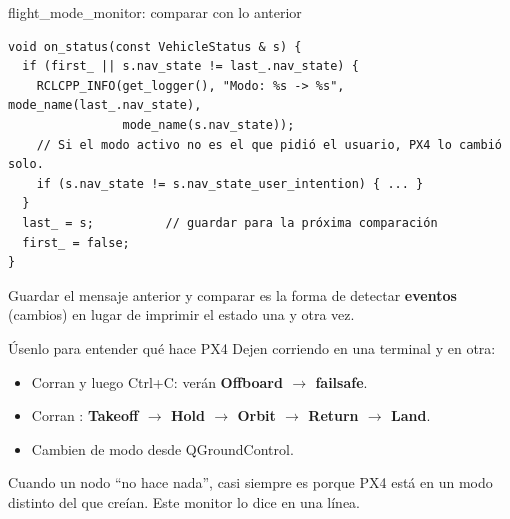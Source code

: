 \begin{frame}[fragile]{flight\_mode\_monitor: comparar con lo anterior}
  \begin{lstlisting}[style=cpp,caption={flight\_mode\_monitor.cpp (recortado)}]
void on_status(const VehicleStatus & s) {
  if (first_ || s.nav_state != last_.nav_state) {
    RCLCPP_INFO(get_logger(), "Modo: %s -> %s", mode_name(last_.nav_state),
                mode_name(s.nav_state));
    // Si el modo activo no es el que pidió el usuario, PX4 lo cambió solo.
    if (s.nav_state != s.nav_state_user_intention) { ... }
  }
  last_ = s;          // guardar para la próxima comparación
  first_ = false;
}
  \end{lstlisting}
  \small Guardar el mensaje anterior y comparar es la forma de detectar \textbf{eventos} (cambios) en
  lugar de imprimir el estado una y otra vez.
\end{frame}

\begin{frame}{Úsenlo para entender qué hace PX4}
  \small Dejen  corriendo en una terminal y en otra:
  \begin{itemize}
    \item Corran  y luego Ctrl+C: verán \textbf{Offboard $\rightarrow$ failsafe}.
    \item Corran : \textbf{Takeoff $\rightarrow$ Hold $\rightarrow$ Orbit $\rightarrow$
      Return $\rightarrow$ Land}.
    \item Cambien de modo desde QGroundControl.
  \end{itemize}
  \begin{idea}
    \small Cuando un nodo ``no hace nada'', casi siempre es porque PX4 está en un modo distinto del que
    creían. Este monitor lo dice en una línea.
  \end{idea}
\end{frame}

